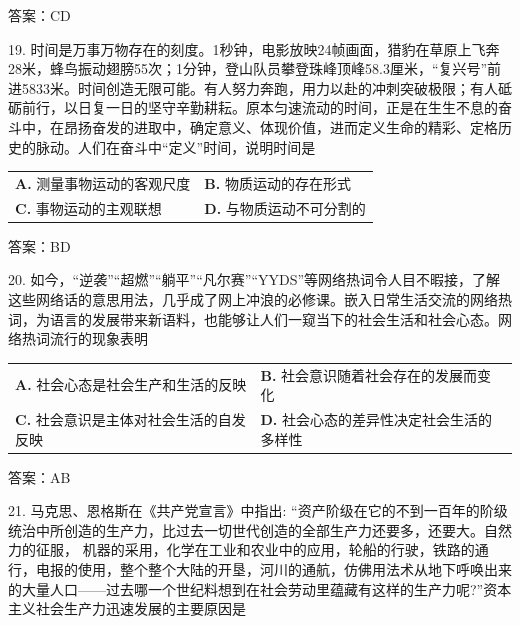 \documentclass[UTF8,11pt]{ctexart}
\begin{document}
答案：CD


19. 时间是万事万物存在的刻度。1秒钟，电影放映24帧画面，猎豹在草原上飞奔28米，蜂鸟振动翅膀55次；1分钟，登山队员攀登珠峰顶峰58.3厘米，“复兴号”前进5833米。时间创造无限可能。有人努力奔跑，用力以赴的冲刺突破极限；有人砥砺前行，以日复一日的坚守辛勤耕耘。原本匀速流动的时间，正是在生生不息的奋斗中，在昂扬奋发的进取中，确定意义、体现价值，进而定义生命的精彩、定格历史的脉动。人们在奋斗中“定义”时间，说明时间是


\begin{center}\begin{tabular}{>{\raggedright\arraybackslash}p{\dimexpr(\linewidth-4\tabcolsep)/2\relax}>{\raggedright\arraybackslash}p{\dimexpr(\linewidth-4\tabcolsep)/2\relax}}
\textbf{A.} 测量事物运动的客观尺度 & \textbf{B.} 物质运动的存在形式\\[.35em]
\textbf{C.} 事物运动的主观联想 & \textbf{D.} 与物质运动不可分割的\\[.35em]\end{tabular}\end{center}

答案：BD


20. 如今，“逆袭”“超燃”“躺平”“凡尔赛”“YYDS”等网络热词令人目不暇接，了解这些网络话的意思用法，几乎成了网上冲浪的必修课。嵌入日常生活交流的网络热词，为语言的发展带来新语料，也能够让人们一窥当下的社会生活和社会心态。网络热词流行的现象表明


\begin{center}\begin{tabular}{>{\raggedright\arraybackslash}p{\dimexpr(\linewidth-4\tabcolsep)/2\relax}>{\raggedright\arraybackslash}p{\dimexpr(\linewidth-4\tabcolsep)/2\relax}}
\textbf{A.} 社会心态是社会生产和生活的反映 & \textbf{B.} 社会意识随着社会存在的发展而变化\\[.35em]
\textbf{C.} 社会意识是主体对社会生活的自发反映 & \textbf{D.} 社会心态的差异性决定社会生活的多样性\\[.35em]\end{tabular}\end{center}

答案：AB


21. 马克思、恩格斯在《共产党宣言》中指出: “资产阶级在它的不到一百年的阶级统治中所创造的生产力，比过去一切世代创造的全部生产力还要多，还要大。自然力的征服， 机器的采用，化学在工业和农业中的应用，轮船的行驶，铁路的通行，电报的使用，整个整个大陆的开垦，河川的通航，仿佛用法术从地下呼唤出来的大量人口——过去哪一个世纪料想到在社会劳动里蕴藏有这样的生产力呢?”资本主义社会生产力迅速发展的主要原因是
\end{document}
